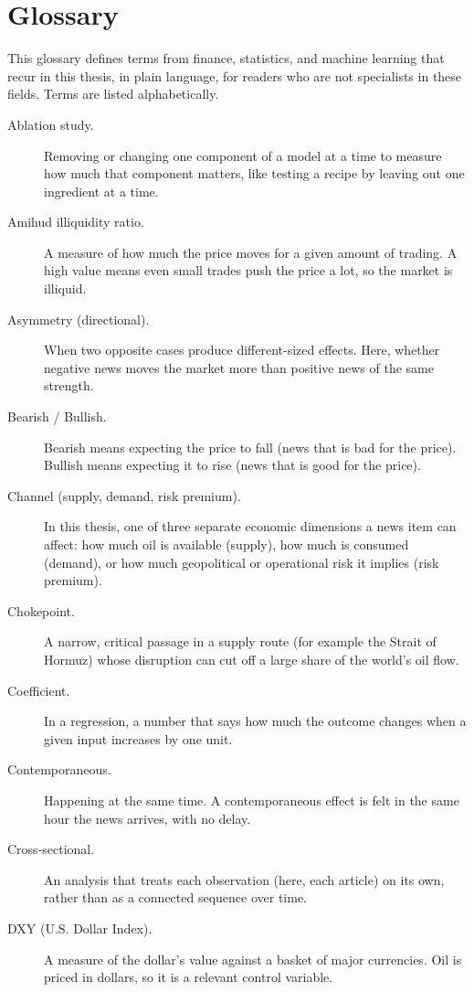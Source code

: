 \chapter*{Glossary}

This glossary defines terms from finance, statistics, and machine learning that recur in this thesis, in plain language, for readers who are not specialists in these fields. Terms are listed alphabetically.

\begin{description}
  \item[Ablation study.] Removing or changing one component of a model at a time to measure how much that component matters, like testing a recipe by leaving out one ingredient at a time.
  \item[Amihud illiquidity ratio.] A measure of how much the price moves for a given amount of trading. A high value means even small trades push the price a lot, so the market is illiquid.
  \item[Asymmetry (directional).] When two opposite cases produce different-sized effects. Here, whether negative news moves the market more than positive news of the same strength.
  \item[Bearish / Bullish.] Bearish means expecting the price to fall (news that is bad for the price). Bullish means expecting it to rise (news that is good for the price).
  \item[Channel (supply, demand, risk premium).] In this thesis, one of three separate economic dimensions a news item can affect: how much oil is available (supply), how much is consumed (demand), or how much geopolitical or operational risk it implies (risk premium).
  \item[Chokepoint.] A narrow, critical passage in a supply route (for example the Strait of Hormuz) whose disruption can cut off a large share of the world's oil flow.
  \item[Coefficient.] In a regression, a number that says how much the outcome changes when a given input increases by one unit.
  \item[Contemporaneous.] Happening at the same time. A contemporaneous effect is felt in the same hour the news arrives, with no delay.
  \item[Cross-sectional.] An analysis that treats each observation (here, each article) on its own, rather than as a connected sequence over time.
  \item[DXY (U.S. Dollar Index).] A measure of the dollar's value against a basket of major currencies. Oil is priced in dollars, so it is a relevant control variable.

\end{description}
